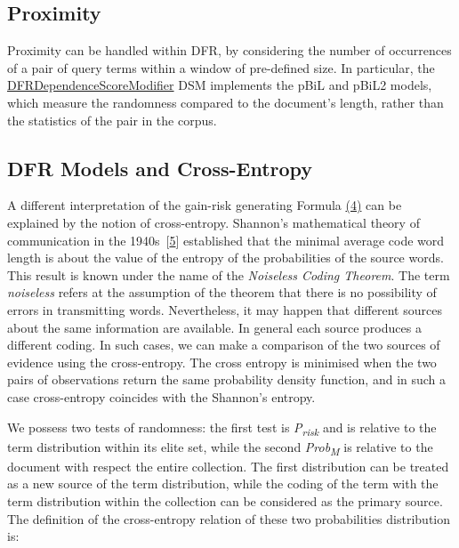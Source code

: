 \subsection{Proximity}\label{proximity}

Proximity can be handled within DFR, by considering the number of
occurrences of a pair of query terms within a window of pre-defined
size. In particular, the
\href{javadoc/org/terrier/matching/dsms/DFRDependenceScoreModifier.html}{DFRDependenceScoreModifier}
DSM implements the pBiL and pBiL2 models, which measure the randomness
compared to the document's length, rather than the statistics of the
pair in the corpus.

\href{}{}

\subsection{DFR Models and
Cross-Entropy}\label{dfr-models-and-cross-entropy}

A different interpretation of the gain-risk generating Formula
\protect\hyperlink{Formula:DFR}{(4)} can be explained by the notion of
cross-entropy. Shannon's mathematical theory of communication in the
1940s~{[}\protect\hyperlink{5}{5}{]} established that the minimal
average code word length is about the value of the entropy of the
probabilities of the source words. This result is known under the name
of the \emph{Noiseless Coding Theorem}. The term \emph{noiseless} refers
at the assumption of the theorem that there is no possibility of errors
in transmitting words. Nevertheless, it may happen that different
sources about the same information are available. In general each source
produces a different coding. In such cases, we can make a comparison of
the two sources of evidence using the cross-entropy. The cross entropy
is minimised when the two pairs of observations return the same
probability density function, and in such a case cross-entropy coincides
with the Shannon's entropy.

We possess two tests of randomness: the first test is
\emph{P\textsubscript{risk}} and is relative to the term distribution
within its elite set, while the second \emph{Prob\textsubscript{M}} is
relative to the document with respect the entire collection. The first
distribution can be treated as a new source of the term distribution,
while the coding of the term with the term distribution within the
collection can be considered as the primary source. The definition of
the cross-entropy relation of these two probabilities distribution is:

